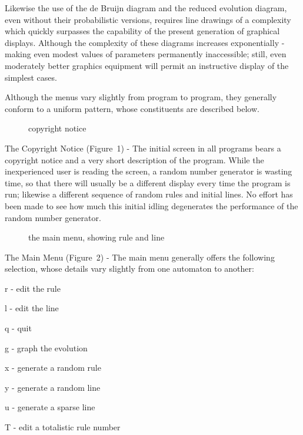 Likewise the use of the de Bruijn diagram and the reduced evolution 
diagram, even without their probabilistic versions, requires line 
drawings of a complexity which quickly surpasses the capability of the 
present generation of graphical displays. Although the complexity of 
these diagrams increases exponentially - making even modest values of 
parameters permanently inaccessible; still, even moderately better 
graphics equipment will permit an instructive display of the simplest 
cases.

Although the menus vary slightly from program to program, they 
generally conform to a uniform pattern, whose constituents are 
described below.

\begin{list}{}{}

\begin{figure}[ht]
\centering
\fbox{\rule{0mm}{60mm}\rule{100mm}{0mm}} 
\caption{copyright notice} 
\end{figure} 

\item[The Copyright Notice (Figure~1)] - The initial screen in all 
programs bears a copyright notice and a very short description of the 
program. While the inexperienced user is reading the screen, a random 
number generator is wasting time, so that there will usually be a 
different display every time the program is run; likewise a different 
sequence of random rules and initial lines. No effort has been made to 
see how much this initial idling degenerates the performance of the 
random number generator.

\begin{figure}[ht]
\centering 
\fbox{\rule{0mm}{45mm}\rule{110mm}{0mm}} 
\caption{the main menu, showing rule and line} 
\end{figure} 

\item[The Main Menu (Figure~2)] - The main menu generally offers the 
following selection, whose details vary slightly from one automaton to 
another: 

\begin{list}{}{}
\item[r] - edit the rule 
\item[l] - edit the line 
\item[q] - quit 
\item[g] - graph the evolution 
\item[x] - generate a random rule 
\item[y] - generate a random line 
\item[u] - generate a sparse line
\item[T] - edit a totalistic rule number


\end{list}
\end{list}
